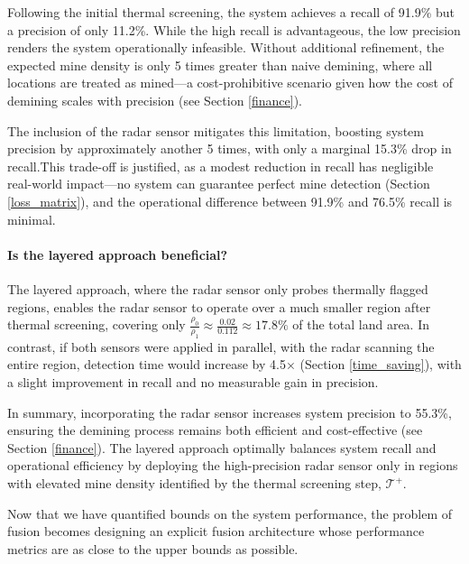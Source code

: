             Following the initial thermal screening, the system achieves a recall of 91.9\% but a precision of only 11.2\%. While the high recall is advantageous, the low precision renders the system operationally infeasible. Without additional refinement, the expected mine density is only 5 times greater than naive demining, where all locations are treated as mined—a cost-prohibitive scenario given how the cost of demining scales with precision (see Section \ref{finance}). 
        
            The inclusion of the radar sensor mitigates this limitation, boosting system precision by approximately another 5 times, with only a marginal 15.3\% drop in recall.This trade-off is justified, as a modest reduction in recall has negligible real-world impact—no system can guarantee perfect mine detection (Section \ref{loss_matrix}), and the operational difference between 91.9\% and 76.5\% recall is minimal.
        
        \paragraph{Is the layered approach beneficial?}
        
            The layered approach, where the radar sensor only probes thermally flagged regions, enables the radar sensor to operate over a much smaller region after thermal screening, covering only $\frac{\rho_0}{\rho_1} \approx \frac{0.02}{0.112} \approx 17.8\%$ of the total land area. In contrast, if both sensors were applied in parallel, with the radar scanning the entire region, detection time would increase by 4.5× (Section \ref{time_saving}), with a slight improvement in recall and no measurable gain in precision.

            In summary, incorporating the radar sensor increases system precision to 55.3\%, ensuring the demining process remains both efficient and cost-effective (see Section \ref{finance}). The layered approach optimally balances system recall and operational efficiency by deploying the high-precision radar sensor only in regions with elevated mine density identified by the thermal screening step, \(\mathcal{T}^+\). 

            Now that we have quantified bounds on the system performance, the problem of fusion becomes designing an explicit fusion architecture whose performance metrics are as close to the upper bounds as possible.
            

        